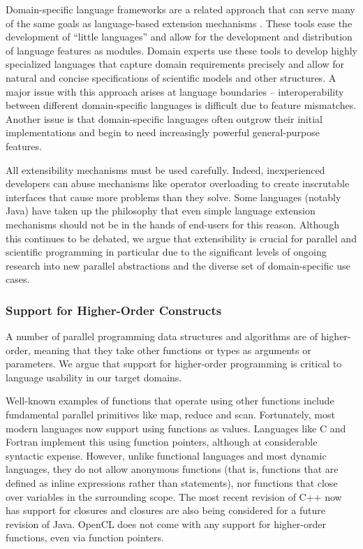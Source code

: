 \documentclass[12pt]{article}
\begin{document}
Domain-specific language frameworks are a related approach that can serve many of the same goals as language-based  extension mechanisms \cite{fowler2010domain}. These tools ease the development of ``little languages'' and allow for the development and distribution of language features as modules. Domain experts use these tools to develop highly specialized languages that capture domain requirements precisely and allow for natural and concise specifications of scientific models and other structures. A major issue with this approach arises at language boundaries -- interoperability between different domain-specific languages is difficult due to feature mismatches. Another issue is that domain-specific languages often outgrow their initial implementations and begin to need increasingly powerful general-purpose features.

All extensibility mechanisms must be used carefully. Indeed, inexperienced developers can abuse mechanisms like operator overloading to create inscrutable interfaces that cause more problems than they solve. Some languages (notably Java) have taken up the philosophy that even simple language extension mechanisms should not be in the hands of end-users for this reason. Although this continues to be debated, we argue that extensibility is crucial for parallel and scientific programming in particular due to the significant levels of ongoing research into new parallel abstractions and the diverse set of domain-specific use cases.

\subsubsection{Support for Higher-Order Constructs}\label{hof}
A number of parallel programming data structures and algorithms are of higher-order, meaning that they take other functions or types as arguments or parameters. We argue that support for higher-order programming is critical to language usability in our target domains.

Well-known examples of functions that operate using other functions include fundamental parallel primitives like map, reduce and scan. Fortunately, most modern languages now support using functions as values. Languages like C and Fortran implement this using function pointers, although at considerable syntactic expense. However, unlike functional languages and most dynamic languages, they do not allow anonymous functions (that is, functions that are defined as inline expressions rather than statements), nor functions that close over variables in the surrounding scope. The most recent revision of C++ now has support for closures and closures are also being considered for a future revision of Java. OpenCL does not come with any support for higher-order functions, even via function pointers.
\end{document}
